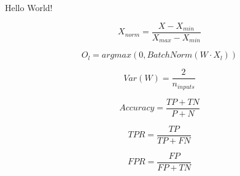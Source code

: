 \documentclass{article}
\begin{document}
Hello World!

$$ X_{norm}=\frac{X-X_{min}}{X_{max}-X_{min}} $$

$$ O_{l}=argmax(0, BatchNorm(W \cdot X_{l})) $$

$$ Var(W)=\frac{2}{n_{inputs}} $$

$$ Accuracy = \frac{TP+TN}{P+N} $$

$$ TPR = \frac{TP}{TP+FN} $$

$$ FPR = \frac{FP}{FP+TN} $$
\end{document}
